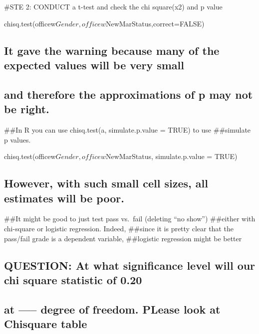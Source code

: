 \documentclass[
]{article}
\begin{document}
\#STE 2: CONDUCT a t-test and check the chi square(x2) and p value

chisq.test(officew\(Gender,officew\)NewMarStatus,correct=FALSE)

\hypertarget{it-gave-the-warning-because-many-of-the-expected-values-will-be-very-small}{%
\subsection{It gave the warning because many of the expected values will
be very
small}\label{it-gave-the-warning-because-many-of-the-expected-values-will-be-very-small}}

\hypertarget{and-therefore-the-approximations-of-p-may-not-be-right.}{%
\subsection{and therefore the approximations of p may not be
right.}\label{and-therefore-the-approximations-of-p-may-not-be-right.}}

\#\#In R you can use chisq.test(a, simulate.p.value = TRUE) to use
\#\#simulate p values.

chisq.test(officew\(Gender,officew\)NewMarStatus, simulate.p.value =
TRUE)

\hypertarget{however-with-such-small-cell-sizes-all-estimates-will-be-poor.}{%
\subsection{However, with such small cell sizes, all estimates will be
poor.}\label{however-with-such-small-cell-sizes-all-estimates-will-be-poor.}}

\#\#It might be good to just test pass vs.~fail (deleting ``no show'')
\#\#either with chi-square or logistic regression. Indeed, \#\#since it
is pretty clear that the pass/fail grade is a dependent variable,
\#\#logistic regression might be better

\hypertarget{question-at-what-significance-level-will-our-chi-square-statistic-of-0.20}{%
\subsection{QUESTION: At what significance level will our chi square
statistic of
0.20}\label{question-at-what-significance-level-will-our-chi-square-statistic-of-0.20}}

\hypertarget{at-degree-of-freedom.-please-look-at-chisquare-table}{%
\subsection{at ----- degree of freedom. PLease look at Chisquare
table}\label{at-degree-of-freedom.-please-look-at-chisquare-table}}
\end{document}
